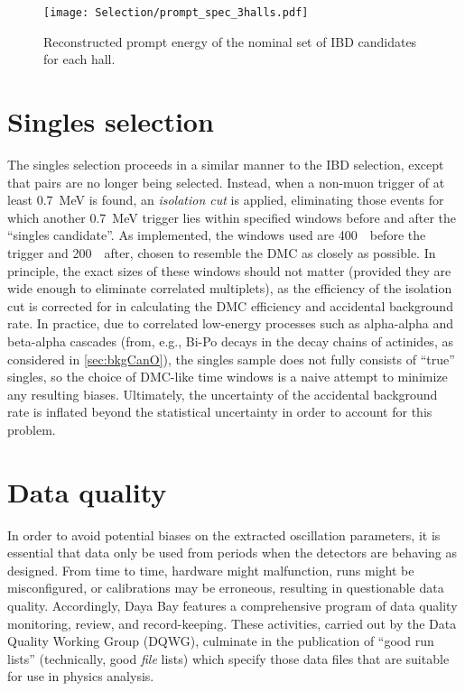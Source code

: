 \documentclass[../thesis.tex]{subfiles}
\begin{document}
\begin{figure}[h]
  \texttt{[image: Selection/prompt\_spec\_3halls.pdf]}
  \caption{Reconstructed prompt energy of the nominal set of IBD candidates for each hall.}
  \label{fig:selPromptSpec}
\end{figure}

\section{Singles selection}
\label{sec:selSingles}

The singles selection proceeds in a similar manner to the IBD selection, except that pairs are no longer being selected. Instead, when a non-muon trigger of at least 0.7~MeV is found, an \emph{isolation cut} is applied, eliminating those events for which another 0.7~MeV trigger lies within specified windows before and after the ``singles candidate''. As implemented, the windows used are 400~\us\ before the trigger and 200~\us\ after, chosen to resemble the DMC as closely as possible. In principle, the exact sizes of these windows should not matter (provided they are wide enough to eliminate correlated multiplets), as the efficiency of the isolation cut is corrected for in calculating the DMC efficiency and accidental background rate. In practice, due to correlated low-energy processes such as alpha-alpha and beta-alpha cascades (from, e.g., Bi-Po decays in the decay chains of actinides, as considered in \autoref{sec:bkgCanO}), the singles sample does not fully consists of ``true'' singles, so the choice of DMC-like time windows is a naive attempt to minimize any resulting biases. Ultimately, the uncertainty of the accidental background rate is inflated beyond the statistical uncertainty in order to account for this problem.

\section{Data quality}
\label{sec:selDataQuality}

In order to avoid potential biases on the extracted oscillation parameters, it is essential that data only be used from periods when the detectors are behaving as designed. From time to time, hardware might malfunction, runs might be misconfigured, or calibrations may be erroneous, resulting in questionable data quality. Accordingly, Daya Bay features a comprehensive program of data quality monitoring, review, and record-keeping. These activities, carried out by the Data Quality Working Group (DQWG), culminate in the publication of ``good run lists'' (technically, good \emph{file} lists) which specify those data files that are suitable for use in physics analysis.
\end{document}

